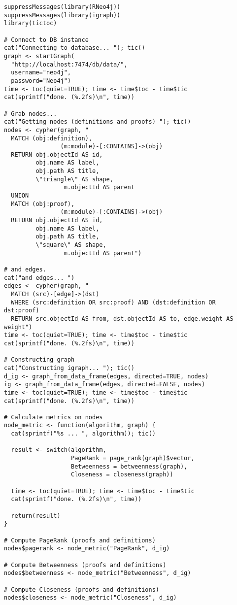 \begin{verbatim}
suppressMessages(library(RNeo4j))
suppressMessages(library(igraph))
library(tictoc)

# Connect to DB instance
cat("Connecting to database... "); tic()
graph <- startGraph(
  "http://localhost:7474/db/data/",
  username="neo4j",
  password="Neo4j")
time <- toc(quiet=TRUE); time <- time$toc - time$tic
cat(sprintf("done. (%.2fs)\n", time))

# Grab nodes...
cat("Getting nodes (definitions and proofs) "); tic()
nodes <- cypher(graph, "
  MATCH (obj:definition),
				(m:module)-[:CONTAINS]->(obj)
  RETURN obj.objectId AS id,
         obj.name AS label,
         obj.path AS title,
         \"triangle\" AS shape,
				 m.objectId AS parent
  UNION
  MATCH (obj:proof),
				(m:module)-[:CONTAINS]->(obj)
  RETURN obj.objectId AS id,
         obj.name AS label,
         obj.path AS title,
         \"square\" AS shape,
				 m.objectId AS parent")

# and edges.
cat("and edges... ")
edges <- cypher(graph, "
  MATCH (src)-[edge]->(dst)
  WHERE (src:definition OR src:proof) AND (dst:definition OR dst:proof)
  RETURN src.objectId AS from, dst.objectId AS to, edge.weight AS weight")
time <- toc(quiet=TRUE); time <- time$toc - time$tic
cat(sprintf("done. (%.2fs)\n", time))

# Constructing graph
cat("Constructing igraph... "); tic()
d_ig <- graph_from_data_frame(edges, directed=TRUE, nodes)
ig <- graph_from_data_frame(edges, directed=FALSE, nodes)
time <- toc(quiet=TRUE); time <- time$toc - time$tic
cat(sprintf("done. (%.2fs)\n", time))

# Calculate metrics on nodes
node_metric <- function(algorithm, graph) {
  cat(sprintf("%s ... ", algorithm)); tic()

  result <- switch(algorithm,
                   PageRank = page_rank(graph)$vector,
                   Betweenness = betweenness(graph),
                   Closeness = closeness(graph))

  time <- toc(quiet=TRUE); time <- time$toc - time$tic
  cat(sprintf("done. (%.2fs)\n", time))

  return(result)
}

# Compute PageRank (proofs and definitions)
nodes$pagerank <- node_metric("PageRank", d_ig)

# Compute Betweenness (proofs and definitions)
nodes$betweenness <- node_metric("Betweenness", d_ig)

# Compute Closeness (proofs and definitions)
nodes$closeness <- node_metric("Closeness", d_ig)


\end{verbatim}

